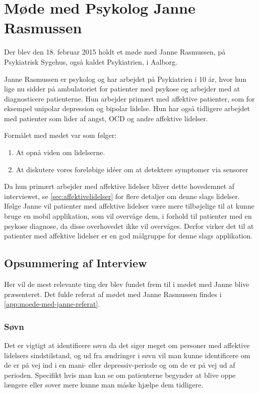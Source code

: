 \section{Møde med Psykolog Janne Rasmussen}\label{sec:moede-med-psykolog}
Der blev den 18. februar 2015 holdt et møde med Janne Rasmussen, på Psykiatrisk Sygehus, også kaldet Psykiatrien, i Aalborg.

Janne Rasmussen er psykolog og har arbejdet på Psykiatrien i 10 år, hvor hun lige nu sidder på ambulatoriet for patienter med psykose og arbejder med at diagnosticere patienterne. 
Hun arbejder primært med affektive patienter, som for eksempel unipolar depression og bipolar lidelse.
Hun har også tidligere arbejdet med patienter som lider af angst, OCD og andre affektive lidelser.

Formålet med mødet var som følger:

\begin{enumerate}
\item At opnå viden om lidelserne.
\item At diskutere vores foreløbige idéer om at detektere symptomer via sensorer
\end{enumerate}

Da hun primært arbejder med affektive lidelser bliver dette hovedemnet af interviewet, se \cref{sec:affektivelidelser} for flere detaljer om denne slags lidelser.
Ifølge Janne vil patienter med affektive lidelser være mere tilbøjelige til at kunne bruge en mobil applikation, som vil overvåge dem, i forhold til patienter med en psykose diagnose, da disse overhovedet ikke vil overvåges.
Derfor virker det til at patienter med affektive lidelser er en god målgruppe for denne slags applikation.

\subsection{Opsummering af Interview}
Her vil de mest relevante ting der blev fundet frem til i mødet med Janne blive præsenteret.
Det fulde referat af mødet med Janne Rasmussen findes i \cref{app:moede-med-janne-referat}.

\subsubsection{Søvn}
Det er vigtigt at identificere søvn da det siger meget om personer med affektive lidelsers sindstilstand, og ud fra ændringer i søvn vil man kunne identificere om de er på vej ind i en mani- eller depressiv-periode og om de er på vej ud af perioden. 
Specifikt hvis man kan se om patienterne begynder at blive oppe længere eller sover mere kunne man måske hjælpe dem tidligere.

